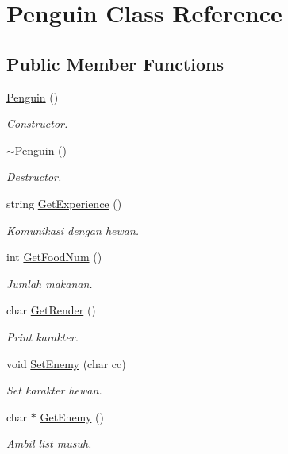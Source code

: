 \hypertarget{class_penguin}{}\section{Penguin Class Reference}
\label{class_penguin}
\subsection*{Public Member Functions}
\begin{DoxyCompactItemize}
\item 
\hyperlink{class_penguin_a215ac88a9d57ac01355e414c0527e862}{Penguin} ()\hypertarget{class_penguin_a215ac88a9d57ac01355e414c0527e862}{}\label{class_penguin_a215ac88a9d57ac01355e414c0527e862}

\begin{DoxyCompactList}\small\item\em Constructor. \end{DoxyCompactList}\item 
\hyperlink{class_penguin_ae0499eebe41aa932463222c2fc8cb51c}{$\sim$\+Penguin} ()\hypertarget{class_penguin_ae0499eebe41aa932463222c2fc8cb51c}{}\label{class_penguin_ae0499eebe41aa932463222c2fc8cb51c}

\begin{DoxyCompactList}\small\item\em Destructor. \end{DoxyCompactList}\item 
string \hyperlink{class_penguin_aded1bfab2ef80cffe06eeeca047a7092}{Get\+Experience} ()\hypertarget{class_penguin_aded1bfab2ef80cffe06eeeca047a7092}{}\label{class_penguin_aded1bfab2ef80cffe06eeeca047a7092}

\begin{DoxyCompactList}\small\item\em Komunikasi dengan hewan. \end{DoxyCompactList}\item 
int \hyperlink{class_penguin_a377a236d30ad834850115ebe793788cd}{Get\+Food\+Num} ()
\begin{DoxyCompactList}\small\item\em Jumlah makanan. \end{DoxyCompactList}\item 
char \hyperlink{class_penguin_a58268f7b86c6479ab0ce6f2206fd60c4}{Get\+Render} ()
\begin{DoxyCompactList}\small\item\em Print karakter. \end{DoxyCompactList}\item 
void \hyperlink{class_penguin_a14c0f549f9980c277c76da24a3d933bd}{Set\+Enemy} (char cc)
\begin{DoxyCompactList}\small\item\em Set karakter hewan. \end{DoxyCompactList}\item 
char $\ast$ \hyperlink{class_penguin_a34d78870785bffdbc59b02310edf3368}{Get\+Enemy} ()
\begin{DoxyCompactList}\small\item\em Ambil list musuh. \end{DoxyCompactList}\end{DoxyCompactItemize}
